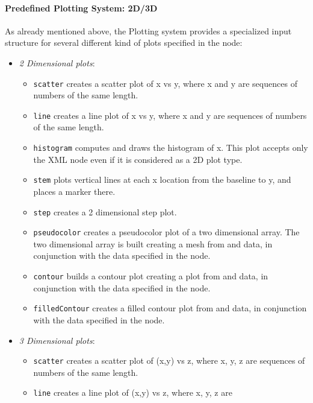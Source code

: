 \paragraph{Predefined Plotting System: 2D/3D \label{sec:23Dplotting}}
As already mentioned above, the Plotting system provides a specialized input
structure for several different kind of plots specified in the 
node:
 \begin{itemize}
  \item \textit{2 Dimensional plots}:
  \begin{itemize}
    \item \texttt{scatter} creates a scatter plot of x vs y, where x and y are
    sequences of numbers of the same length.
    \item \texttt{line} creates a line plot of x vs y, where x and y are
    sequences of numbers of the same length.
    \item \texttt{histogram} computes and draws the histogram of x.
    \nb This plot accepts only the XML node  even if it
    is considered as a 2D plot type.
    \item \texttt{stem} plots vertical lines at each x location from the
    baseline to y, and places a marker there.
    \item \texttt{step} creates a 2 dimensional step plot.
    \item \texttt{pseudocolor} creates a pseudocolor plot of a two dimensional
    array.
    The two dimensional array is built creating a mesh from  and
     data, in conjunction with the data specified in the 
     node.
    \item \texttt{contour} builds a contour plot creating a plot from
     and  data, in conjunction with the data specified in
    the  node.
    \item \texttt{filledContour} creates a filled contour plot from 
    and  data, in conjunction with the data specified in the 
     node.
  \end{itemize}
  \item \textit{3 Dimensional plots}:
  \begin{itemize}
    \item \texttt{scatter} creates a scatter plot of (x,y) vs z, where x, y, z
    are sequences of numbers of the same length.
    \item \texttt{line} creates a line plot of (x,y) vs z, where x, y, z are

\end{itemize}
\end{itemize}

